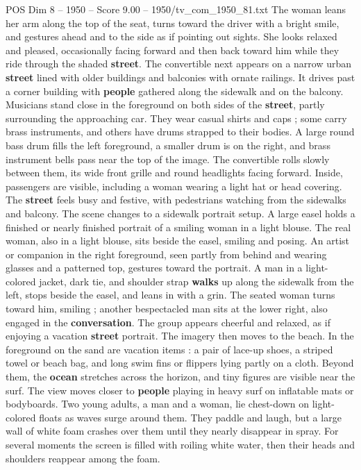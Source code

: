 \begin{textsample}{POS Dim 8 – 1950 – Score 9.00 – 1950/tv\_com\_1950\_81.txt}
The woman leans her arm along the top of the seat, turns toward the driver with a bright smile, and gestures ahead and to the side as if pointing out sights.
She looks relaxed and pleased, occasionally facing forward and then back toward him while they ride through the shaded \textbf{street}.
The convertible next appears on a narrow urban \textbf{street} lined with older buildings and balconies with ornate railings.
It drives past a corner building with \textbf{people} gathered along the sidewalk and on the balcony.
Musicians stand close in the foreground on both sides of the \textbf{street}, partly surrounding the approaching car.
They wear casual shirts and caps ; some carry brass instruments, and others have drums strapped to their bodies.
A large round bass drum fills the left foreground, a smaller drum is on the right, and brass instrument bells pass near the top of the image.
The convertible rolls slowly between them, its wide front grille and round headlights facing forward.
Inside, passengers are visible, including a woman wearing a light hat or head covering.
The \textbf{street} feels busy and festive, with pedestrians watching from the sidewalks and balcony.
The scene changes to a sidewalk portrait setup.
A large easel holds a finished or nearly finished portrait of a smiling woman in a light blouse.
The real woman, also in a light blouse, sits beside the easel, smiling and posing.
An artist or companion in the right foreground, seen partly from behind and wearing glasses and a patterned top, gestures toward the portrait.
A man in a light-colored jacket, dark tie, and shoulder strap \textbf{walks} up along the sidewalk from the left, stops beside the easel, and leans in with a grin.
The seated woman turns toward him, smiling ; another bespectacled man sits at the lower right, also engaged in the \textbf{conversation}.
The group appears cheerful and relaxed, as if enjoying a vacation \textbf{street} portrait.
The imagery then moves to the beach.
In the foreground on the sand are vacation items : a pair of lace-up shoes, a striped towel or beach bag, and long swim fins or flippers lying partly on a cloth.
Beyond them, the \textbf{ocean} stretches across the horizon, and tiny figures are visible near the surf.
The view moves closer to \textbf{people} playing in heavy surf on inflatable mats or bodyboards.
Two young adults, a man and a woman, lie chest-down on light-colored floats as waves surge around them.
They paddle and laugh, but a large wall of white foam crashes over them until they nearly disappear in spray.
For several moments the screen is filled with roiling white water, then their heads and shoulders reappear among the foam.

\end{textsample}
